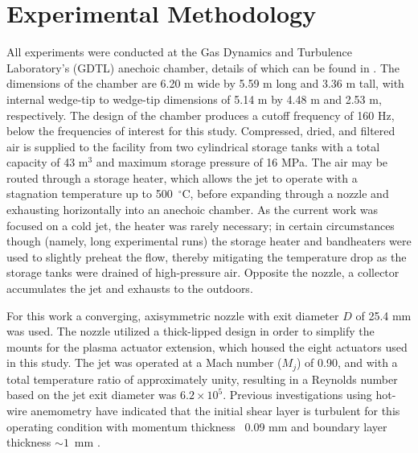 \section{Experimental Methodology}
\label{methodology}
All experiments were conducted at the Gas Dynamics and Turbulence Laboratory's (GDTL) anechoic chamber, details of which can be found in \citet{Hahn2011}. 
The dimensions of the chamber are 6.20 m wide by 5.59 m long and 3.36 m tall, with internal wedge-tip to wedge-tip dimensions of 5.14 m by 4.48 m and 2.53 m, respectively. 
The design of the chamber produces a cutoff frequency of 160 Hz, below the frequencies of interest for this study.
Compressed, dried, and filtered air is supplied to the facility from two cylindrical storage tanks with a total capacity of 43 m$^{3}$ and maximum storage pressure of 16 MPa.
The air may be routed through a storage heater, which allows the jet to operate with a stagnation temperature up to 500~$^\circ$C, before expanding through a nozzle and exhausting horizontally into an anechoic chamber. 
As the current work was focused on a cold jet, the heater was rarely necessary; in certain circumstances though (namely, long experimental runs) the storage heater and bandheaters were used to slightly preheat the flow, thereby mitigating the temperature drop as the storage tanks were drained of high-pressure air.
Opposite the nozzle, a collector accumulates the jet and exhausts to the outdoors.  

For this work a converging, axisymmetric nozzle with exit diameter $D$ of 25.4 mm was used. 
The nozzle utilized a thick-lipped design in order to simplify the mounts for the plasma actuator extension, which housed the eight actuators used in this study. 
The jet was operated at a Mach number ($M_j$) of 0.90, and with a total temperature ratio of approximately unity, resulting in a Reynolds number based on the jet exit diameter was $6.2\times 10^5$.
Previous investigations using hot-wire anemometry have indicated that the initial shear layer is turbulent for this operating condition with momentum thickness ~0.09 mm and boundary layer thickness $\sim 1$~mm \citep{Kearney-Fischer2009}.

